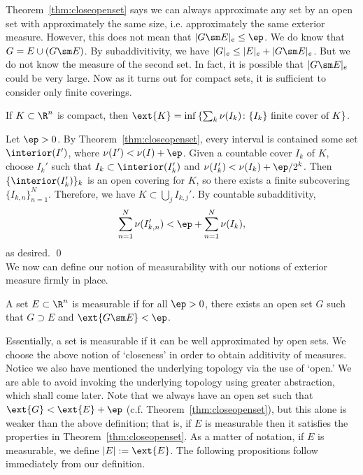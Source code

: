 Theorem~\ref{thm:closeopenset} says we can always approximate any set by an open set with approximately the same size, i.e. approximately the same exterior measure. However, this does not mean that $|G \sm E|_e \leq \ep$. We do know that $G = E \cup (G\sm E)$. By subaddivitivity, we have $|G|_e \leq |E|_e + |G \sm E|_e$. But we do not know the measure of the second set. In fact, it is possible that $|G \sm E|_e$ could be very large. Now as it turns out for compact sets, it is sufficient to consider only finite coverings.


\begin{prop} \label{prop:fincovcomset}
If $K \subset \R^n$ is compact, then $\ext{K}= \inf \left\{ \sum_k \nu(I_k) \colon \{I_k\} \text{ finite cover of }K \right\}$. 
\end{prop}

\pf Let $\ep>0$. By Theorem~\ref{thm:closeopenset}, every interval is contained some set $\interior(I')$, where $\nu(I')< \nu(I) + \ep$. Given a countable cover $I_k$ of $K$, choose $I_k'$ such that $I_k \subset \interior(I_k')$ and $\nu(I_k') < \nu(I_k) + \ep/2^k$. Then $\{\interior(I_k')\}_k$ is an open covering for $K$, so there exists a finite subcovering $\{I_{k,n}\}_{n=1}^N$. Therefore, we have $K \subset \bigcup_j I_{k,j}'$. By countable subadditivity,
	\[
	\sum_{n=1}^N \nu(I_{k,n}') < \ep + \sum_{n=1}^N \nu(I_k),
	\]
as desired. \qed \\


We now can define our notion of measurability with our notions of exterior measure firmly in place. 


\begin{dfn}[Measurable]
A set $E \subset \R^n$ is measurable if for all $\ep>0$, there exists an open set $G$ such that $G \supset E$ and $\ext{G \sm E} < \ep$.
\end{dfn}


Essentially, a set is measurable if it can be well approximated by open sets. We choose the above notion of `closeness' in order to obtain additivity of measures. Notice we also have mentioned the underlying topology via the use of `open.' We are able to avoid invoking the underlying topology using greater abstraction, which shall come later. Note that we always have an open set such that $\ext{G} < \ext{E}+\ep$ (c.f. Theorem~\ref{thm:closeopenset}), but this alone is weaker than the above definition; that is, if $E$ is measurable then it satisfies the properties in Theorem~\ref{thm:closeopenset}. As a matter of notation, if $E$ is measurable, we define $|E|:= \ext{E}$. The following propositions follow immediately from our definition.


